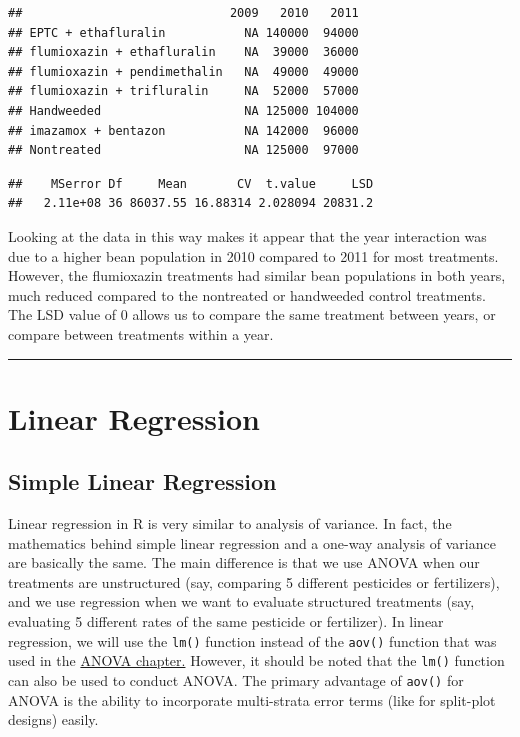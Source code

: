 \documentclass[letterpaper,]{book}
\newenvironment{Shaded}{\begin{snugshade}}{\end{snugshade}}
\newcommand{\NormalTok}[1]{#1}
\newcommand{\OperatorTok}[1]{\textcolor[rgb]{0.81,0.36,0.00}{\textbf{#1}}}
\begin{document}
\begin{verbatim}
##                             2009   2010   2011
## EPTC + ethafluralin           NA 140000  94000
## flumioxazin + ethafluralin    NA  39000  36000
## flumioxazin + pendimethalin   NA  49000  49000
## flumioxazin + trifluralin     NA  52000  57000
## Handweeded                    NA 125000 104000
## imazamox + bentazon           NA 142000  96000
## Nontreated                    NA 125000  97000
\end{verbatim}

\begin{Shaded}
\end{Shaded}

\begin{verbatim}
##    MSerror Df     Mean       CV  t.value     LSD
##   2.11e+08 36 86037.55 16.88314 2.028094 20831.2
\end{verbatim}

Looking at the data in this way makes it appear that the year interaction was due to a higher bean population in 2010 compared to 2011 for most treatments. However, the flumioxazin treatments had similar bean populations in both years, much reduced compared to the nontreated or handweeded control treatments. The LSD value of 0 allows us to compare the same treatment between years, or compare between treatments within a year.

\begin{center}\rule{0.5\linewidth}{0.5pt}\end{center}

\hypertarget{linear-regression}{%
\chapter{Linear Regression}\label{linear-regression}}

\hypertarget{simple-linear-regression}{%
\section{Simple Linear Regression}\label{simple-linear-regression}}

Linear regression in R is very similar to analysis of variance. In fact, the mathematics behind simple linear regression and a one-way analysis of variance are basically the same. The main difference is that we use ANOVA when our treatments are unstructured (say, comparing 5 different pesticides or fertilizers), and we use regression when we want to evaluate structured treatments (say, evaluating 5 different rates of the same pesticide or fertilizer). In linear regression, we will use the \texttt{lm()} function instead of the \texttt{aov()} function that was used in the \protect\hyperlink{anova}{ANOVA chapter.} However, it should be noted that the \texttt{lm()} function can also be used to conduct ANOVA. The primary advantage of \texttt{aov()} for ANOVA is the ability to incorporate multi-strata error terms (like for split-plot designs) easily.
\end{document}
